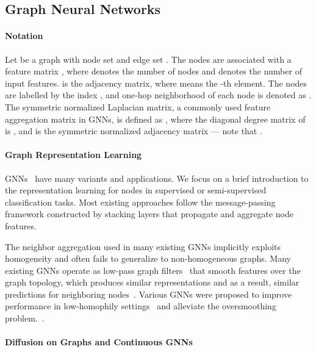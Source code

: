 \documentclass{article}
\theoremstyle{plain}
\theoremstyle{definition}
\theoremstyle{remark}
\begin{document}
\subsection{Graph Neural Networks}
\paragraph{Notation}
Let  be a graph with node set  and edge set . The nodes are associated with a feature matrix , where  denotes the number of nodes and  denotes the number of input features.  is the adjacency matrix, where  means the -th element. The nodes are labelled by the index , and one-hop neighborhood of each node is denoted as . 
The symmetric normalized Laplacian matrix, a commonly used feature aggregation matrix in GNNs, is defined as , where the diagonal degree matrix of  is , and  is the symmetric normalized adjacency matrix --- note that .






\paragraph{Graph Representation Learning}
GNNs~\cite{kipf2017GCN,velickovic2018GAT,hamilton2017graphSAGE,Wu2019SGC,zhu2020ssgc} have many variants and applications. We focus on a brief introduction to the representation learning for nodes in supervised or semi-supervised classification tasks. Most existing approaches follow the message-passing framework constructed by stacking layers that propagate and aggregate node features.

The neighbor aggregation used in many existing GNNs implicitly exploits homogeneity and often fails to generalize to non-homogeneous graphs. Many existing GNNs operate as low-pass graph filters~\cite{balcilar2021analyzing} that smooth features over the graph topology, which produces similar representations and as a result, similar predictions for neighboring nodes~\cite{tiezzi2021deep,oono2020oversmoothing,li2018deeper}. Various GNNs were proposed to improve performance in low-homophily settings~\cite{pei2020geomGCN,abu2019mixhop,zhu2020h2gcn,chien2021GPRGNN,he2021bernnet,lim2022LINKX,luan2022ACMGCN,bodnar2022Sheaf,giovanni2022GRAFF,li2022GloGNN} and alleviate the oversmoothing problem.~\cite{xu2018jknet,chen2020gcnii,zhao2020pairnorm,rusch2022gcon}.




\paragraph{Diffusion on Graphs and Continuous GNNs}
\end{document}
